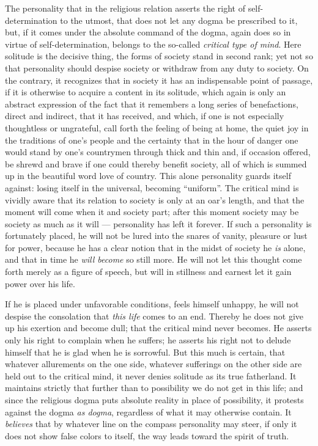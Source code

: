 \documentclass[12pt,a4paper,openany]{book}
\newcommand{\opage}[1]{\marginnote{\footnotesize\textit{[#1]}}}
\begin{document}
The personality that in the religious relation asserts the right of self-determination
to the utmost, that does not let any dogma be prescribed to it, but, if it comes under
the absolute command of the dogma, again does so in virtue of self-determination, belongs
to the so-called \emph{critical type of mind}. Here solitude is the decisive thing, the
forms of society stand in second rank; yet not so that personality should despise society
or withdraw from any duty to society. On the contrary, it recognizes that in society it
has an indispensable point of passage, if it is otherwise to acquire a content in its
solitude, which again is only an abstract expression of the fact that it remembers a long
series of benefactions, direct and indirect, that it has received, and which, if one is
not especially thoughtless or ungrateful, call forth the feeling of being at home, the
quiet joy in the traditions of one's people and the certainty that in the hour of danger
one would stand by one's countrymen through thick and thin and, if occasion offered, be
shrewd and brave if one could thereby benefit society, all of which is summed up in the
beautiful word love of country. This alone personality guards itself against: losing
itself in the universal, becoming ``uniform''. The critical mind is vividly aware that
its relation to society is only at an oar's length, and that the moment will come when it
and society part; after this moment society
\setcounter{footnote}{0}%
\opage{230}may be society as much as it will --- personality has left it forever. If such a
personality is fortunately placed, he will not be lured into the snares of vanity,
pleasure or lust for power, because he has a clear notion that in the midst of society he
\emph{is} alone, and that in time he \emph{will become} so still more. He will not let this
thought come forth merely as a figure of speech, but will in stillness and earnest let it
gain power over his life.

If he is placed under unfavorable conditions, feels himself unhappy, he will not despise
the consolation that \emph{this life} comes to an end. Thereby he does not give up his %
exertion and become dull; that the critical mind never becomes. He asserts only his right
to complain when he suffers; he asserts his right not to delude himself that he is glad
when he is sorrowful. But this much is certain, that whatever allurements on the one
side, whatever sufferings on the other side are held out to the critical mind, it never
denies solitude as its true fatherland. It maintains strictly that further than to
possibility we do not get in this life; and since the religious dogma puts absolute
reality in place of possibility, it protests against the dogma \emph{as dogma}, regardless
of what it may otherwise contain. It \emph{believes} that by whatever line on the compass
personality may steer, if only it does not show false colors to itself, the way leads
toward the spirit of truth.
\end{document}

